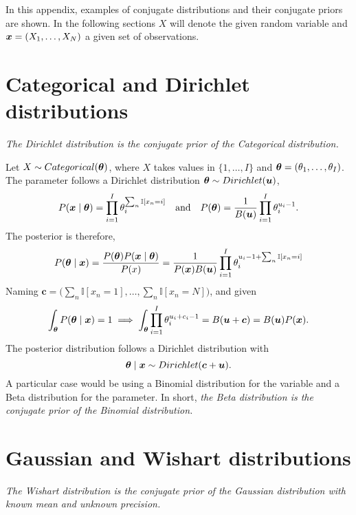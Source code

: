 In this appendix, examples of conjugate distributions and their conjugate priors are shown. In the following sections \(X\) will denote the given random variable and \(\bm{x} = (X_{1},\dots,X_{N})\) a given set of observations.

\section{Categorical and Dirichlet distributions}\label{ap:C-D}

\emph{The Dirichlet distribution is the conjugate prior of the Categorical distribution.}

Let \(X \sim Categorical(\bm{\theta})\), where \(X\) takes values in \(\{1,\dots,I\}\) and \(\bm{\theta} = (\theta_{1},\dots,\theta_{I})\). The parameter follows a Dirichlet distribution \(\bm{\theta} \sim Dirichlet(\bm{u})\),
\[
  P(\bm{x} \mid \bm{\theta}) = \prod_{i=1}^{I}\theta_{i}^{\sum_{n} \mathbb{I}[x_{n}=i]} \quad \text{and} \quad P(\bm{\theta}) = \frac{1}{B(\bm{u})}\prod_{i=1}^{I}\theta_{i}^{u_{i}-1}.
\]
The posterior is therefore,
\[
  P(\bm{\theta} \mid \bm{x}) = \frac{P(\bm{\theta})P(\bm{x} \mid \bm{\theta})}{P(x)} = \frac{1}{P(\bm{x})B(\bm{u})}\prod_{i=1}^{I}\theta_{i}^{u_{i}-1 + \sum_{n} \mathbb{I}[x_{n}=i]}
\]
Naming \(\bm{c} = \big(\sum_{n}\mathbb{I}[x_{n}=1], \dots, \sum_{n}\mathbb{I}[x_{n}=N]\big)\),
and given
\[
  \int_{\bm{\theta}}P(\bm{\theta} \mid \bm{x}) = 1 \implies \int_{\bm{\theta}}\prod_{i=1}^{I}\theta_{i}^{u_{i} + c_{i} - 1} = B(\bm{u} + \bm{c}) = B(\bm{u})P(\bm{x}).
\]
The posterior distribution follows a Dirichlet distribution with
\[
  \bm{\theta} \mid \bm{x} \sim Dirichlet(\bm{c} + \bm{u}).
\]
A particular case would be using a Binomial distribution for the variable and a Beta distribution for the parameter. In short, \emph{the Beta distribution is the conjugate prior of the Binomial distribution.}

\section{Gaussian and Wishart distributions}

\emph{The Wishart distribution is the conjugate prior of the Gaussian distribution with known mean and unknown precision.}

